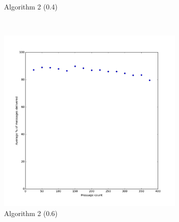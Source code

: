 \documentclass[bsc,frontabs,twoside,singlespacing,parskip,deptreport]{infthesis}     %
\begin{document}
\begin{figure}
\begin{subfigure}[b]{0.3\textwidth}
        \caption{Algorithm 2 (0.4)}
        \label{fig:results/Prob50Share_Prob40}
    \end{subfigure}
    ~ %
    
    
    \begin{subfigure}[b]{0.3\textwidth}
        \includegraphics[width=\textwidth]{results/Prob50Share_Prob60}
        \caption{Algorithm 2 (0.6)}
        \label{fig:results/Prob50Share_Prob60}
    \end{subfigure}
    ~ %
    \begin{subfigure}[b]{0.3\textwidth}

\end{subfigure}
\end{figure}
\end{document}
